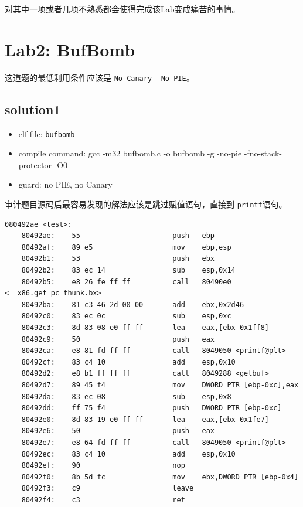 \documentclass[a4pper,12pt,onecolumn]{article}
\begin{document}
对其中一项或者几项不熟悉都会使得完成该Lab变成痛苦的事情。

\section{Lab2: BufBomb}

这道题的最低利用条件应该是  \texttt{No Canary}+ \texttt{No PIE}。

\subsection{solution1}

\begin{itemize}
    \item elf file:  \texttt{bufbomb}
    \item compile command: gcc -m32 bufbomb.c -o bufbomb -g -no-pie -fno-stack-protector -O0
    \item guard: no PIE, no Canary
\end{itemize}

审计题目源码后最容易发现的解法应该是跳过赋值语句，直接到 \texttt{printf}语句。

\begin{lstlisting}[style=DOS]
    080492ae <test>:
    80492ae:	55                   	push   ebp
    80492af:	89 e5                	mov    ebp,esp
    80492b1:	53                   	push   ebx
    80492b2:	83 ec 14             	sub    esp,0x14
    80492b5:	e8 26 fe ff ff       	call   80490e0 <__x86.get_pc_thunk.bx>
    80492ba:	81 c3 46 2d 00 00    	add    ebx,0x2d46
    80492c0:	83 ec 0c             	sub    esp,0xc
    80492c3:	8d 83 08 e0 ff ff    	lea    eax,[ebx-0x1ff8]
    80492c9:	50                   	push   eax
    80492ca:	e8 81 fd ff ff       	call   8049050 <printf@plt>
    80492cf:	83 c4 10             	add    esp,0x10
    80492d2:	e8 b1 ff ff ff       	call   8049288 <getbuf>
    80492d7:	89 45 f4             	mov    DWORD PTR [ebp-0xc],eax
    80492da:	83 ec 08             	sub    esp,0x8
    80492dd:	ff 75 f4             	push   DWORD PTR [ebp-0xc]
    80492e0:	8d 83 19 e0 ff ff    	lea    eax,[ebx-0x1fe7]
    80492e6:	50                   	push   eax
    80492e7:	e8 64 fd ff ff       	call   8049050 <printf@plt>
    80492ec:	83 c4 10             	add    esp,0x10
    80492ef:	90                   	nop
    80492f0:	8b 5d fc             	mov    ebx,DWORD PTR [ebp-0x4]
    80492f3:	c9                   	leave  
    80492f4:	c3                   	ret
\end{lstlisting}
\end{document}
